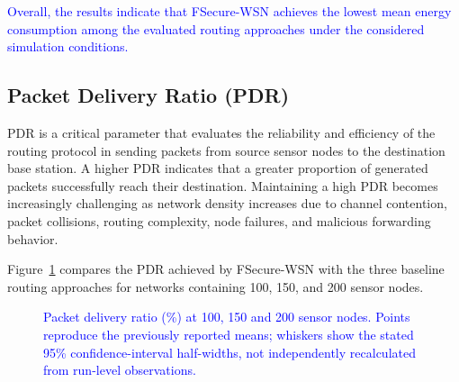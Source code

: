 \documentclass[pdflatex,sn-mathphys-num]{sn-jnl}
\newcommand{\Revised}[1]{\textcolor{blue}{#1}}
\begin{document}
\textcolor{blue}{Overall, the results indicate that FSecure-WSN achieves the
lowest mean energy consumption among the evaluated routing approaches under
the considered simulation conditions.}


\subsection{Packet Delivery Ratio (PDR)}

PDR is a critical parameter that evaluates the reliability and efficiency of
the routing protocol in sending packets from source sensor nodes to the
destination base station. A higher PDR indicates that a greater proportion
of generated packets successfully reach their destination. Maintaining a
high PDR becomes increasingly challenging as network density increases due
to channel contention, packet collisions, routing complexity, node failures,
and malicious forwarding behavior.

Figure~\ref{fig:pdr} compares the PDR achieved by FSecure-WSN with the three
baseline routing approaches for networks containing 100, 150, and 200 sensor
nodes.

\begin{figure}[!tb]
\centering
{}
\caption{\Revised{Packet delivery ratio (\%) at 100, 150 and 200 sensor nodes. Points reproduce the previously reported means; whiskers show the stated 95\% confidence-interval half-widths, not independently recalculated from run-level observations.}}
\label{fig:pdr}
\end{figure}
\end{document}
